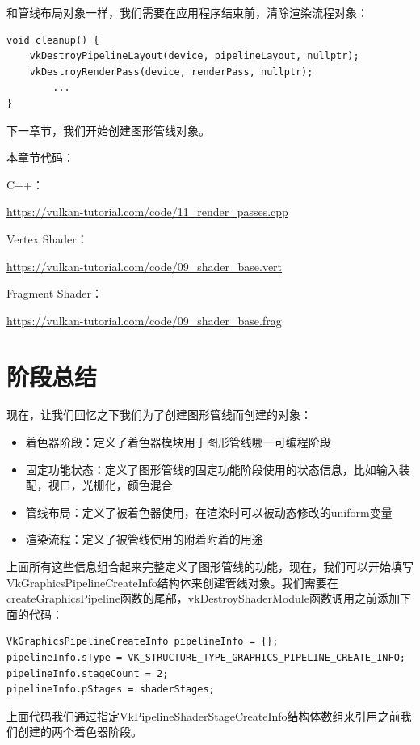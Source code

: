 \documentclass{ctexart}
\begin{document}
和管线布局对象一样，我们需要在应用程序结束前，清除渲染流程对象：

\begin{lstlisting}[language={[ANSI]C}]
void cleanup() {
	vkDestroyPipelineLayout(device, pipelineLayout, nullptr);
	vkDestroyRenderPass(device, renderPass, nullptr);
		...
}
\end{lstlisting}

下一章节，我们开始创建图形管线对象。

本章节代码：

C++：

\url{https://vulkan-tutorial.com/code/11_render_passes.cpp}

Vertex Shader：

\url{https://vulkan-tutorial.com/code/09_shader_base.vert}

Fragment Shader：

\url{https://vulkan-tutorial.com/code/09_shader_base.frag}

\newpage
\section{阶段总结}

现在，让我们回忆之下我们为了创建图形管线而创建的对象：

\begin{itemize}
	\item 着色器阶段：定义了着色器模块用于图形管线哪一可编程阶段
	\item 固定功能状态：定义了图形管线的固定功能阶段使用的状态信息，比如输入装配，视口，光栅化，颜色混合
	\item 管线布局：定义了被着色器使用，在渲染时可以被动态修改的uniform变量
	\item 渲染流程：定义了被管线使用的附着附着的用途
\end{itemize}

上面所有这些信息组合起来完整定义了图形管线的功能，现在，我们可以开始填写VkGraphicsPipelineCreateInfo结构体来创建管线对象。我们需要在createGraphicsPipeline函数的尾部，vkDestroyShaderModule函数调用之前添加下面的代码：

\begin{lstlisting}[language={[ANSI]C}]
VkGraphicsPipelineCreateInfo pipelineInfo = {};
pipelineInfo.sType = VK_STRUCTURE_TYPE_GRAPHICS_PIPELINE_CREATE_INFO;
pipelineInfo.stageCount = 2;
pipelineInfo.pStages = shaderStages;
\end{lstlisting}

上面代码我们通过指定VkPipelineShaderStageCreateInfo结构体数组来引用之前我们创建的两个着色器阶段。
\end{document}
